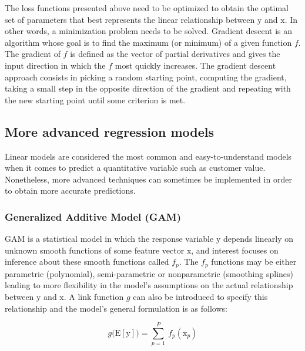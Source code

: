 \documentclass[
]{book}
\begin{document}
The loss functions presented above need to be optimized to obtain the optimal set of parameters that best represents the linear relationship between \(\mathrm{y}\) and \(\pmb{\mathrm{x}}\). In other words, a minimization problem needs to be solved. Gradient descent is an algorithm whose goal is to find the maximum (or minimum) of a given function \(f\). The gradient of \(f\) is defined as the vector of partial derivatives and gives the input direction in which the \(f\) most quickly increases. The gradient descent approach consists in picking a random starting point, computing the gradient, taking a small step in the opposite direction of the
gradient and repeating with the new starting point until some criterion is met.

\hypertarget{more-advanced-regression-models}{%
\subsection{More advanced regression models}\label{more-advanced-regression-models}}

Linear models are considered the most common and easy-to-understand models when it comes to predict a quantitative variable such as customer value. Nonetheless, more advanced techniques can sometimes be implemented in order to obtain more accurate predictions.

\hypertarget{generalized-additive-model-gam}{%
\subsubsection*{Generalized Additive Model (GAM)}\label{generalized-additive-model-gam}}

GAM is a statistical model in which the response variable \(\mathrm{y}\) depends linearly on unknown smooth functions of some feature vector \(\pmb{\mathrm{x}}\), and interest focuses on inference about these smooth functions called \(f_p\). The \(f_p\) functions may be either parametric (polynomial), semi-parametric or nonparametric (smoothing splines) leading to more flexibility in the model's assumptions on the actual relationship between \(\mathrm{y}\) and \(\pmb{\mathrm{x}}\). A link function \(g\) can also be introduced to specify this relationship and the model's general formulation is as follows:

\begin{equation}
  g\big(\mathrm{E} [\mathrm{y}] \big) = \sum_{p=1}^P \ f_p(\mathrm{x}_p)
  \label{eq:gam}
\end{equation}
\end{document}

